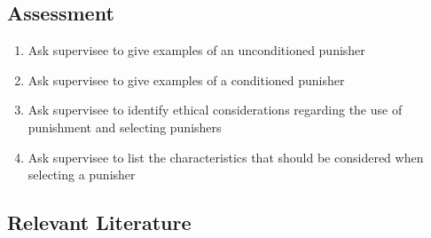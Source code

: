 \subsection{Assessment}
\begin{enumerate}
\item Ask supervisee to give examples of an unconditioned punisher
\item Ask supervisee to give examples of a conditioned  punisher
\item Ask supervisee to identify ethical considerations regarding the use of punishment and selecting punishers 
\item Ask supervisee to list the characteristics that should be considered when selecting a punisher 
\end{enumerate}
%
\subsection{Relevant Literature}
\begin{refsection}
\nocite{test,alang2017police,clayton2018black}
\printbibliography[heading=none]
\end{refsection}
